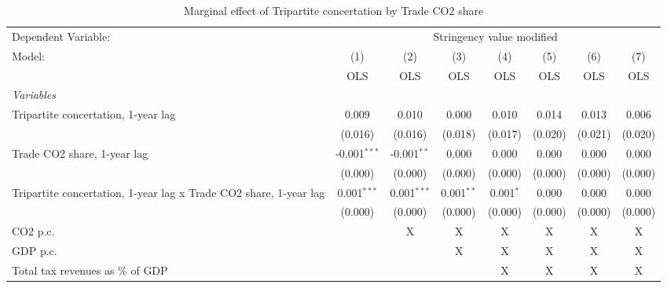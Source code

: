 
\begin{table}[htbp]
   \caption{Marginal effect of Tripartite concertation by Trade CO2 share}
   \centering
   \begin{tabular}{lccccccc}
      \toprule
      Dependent Variable: & \multicolumn{7}{c}{Stringency value modified}\\
      Model:                                                            & (1)            & (2)           & (3)          & (4)         & (5)     & (6)     & (7)\\  
                                                                        &  OLS           & OLS           & OLS          & OLS         & OLS     & OLS     & OLS\\  
      \midrule
      \emph{Variables}\\
      Tripartite concertation, 1-year lag                               & 0.009          & 0.010         & 0.000        & 0.010       & 0.014   & 0.013   & 0.006\\   
                                                                        & (0.016)        & (0.016)       & (0.018)      & (0.017)     & (0.020) & (0.021) & (0.020)\\   
      Trade CO2 share, 1-year lag                                       & -0.001$^{***}$ & -0.001$^{**}$ & 0.000        & 0.000       & 0.000   & 0.000   & 0.000\\   
                                                                        & (0.000)        & (0.000)       & (0.000)      & (0.000)     & (0.000) & (0.000) & (0.000)\\   
      Tripartite concertation, 1-year lag x Trade CO2 share, 1-year lag & 0.001$^{***}$  & 0.001$^{***}$ & 0.001$^{**}$ & 0.001$^{*}$ & 0.000   & 0.000   & 0.000\\   
                                                                        & (0.000)        & (0.000)       & (0.000)      & (0.000)     & (0.000) & (0.000) & (0.000)\\   
      CO2 p.c.                                                          &                & X             & X            & X           & X       & X       & X\\  
      GDP p.c.                                                          &                &               & X            & X           & X       & X       & X\\  
      Total tax revenues as \% of GDP                                   &                &               &              & X           & X       & X       & X\\  

\end{tabular}
\end{table}
